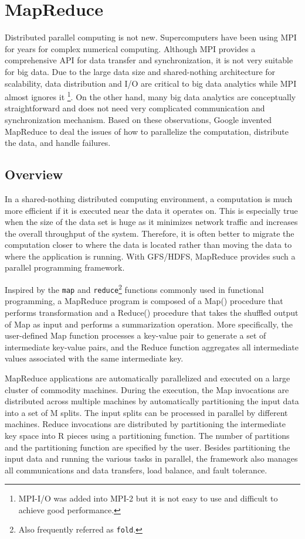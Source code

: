 \documentclass[12pt]{book}
\begin{document}
\section[MapReduce]
{MapReduce}
Distributed parallel computing is not new. Supercomputers have been using MPI \cite{Forum:1994:MMI} for years for complex numerical computing. Although MPI provides a comprehensive API for data transfer and synchronization, it is not very suitable for big data. Due to the large data size and shared-nothing architecture for scalability, data distribution and I/O are critical to big data analytics while MPI almost ignores it \footnote{MPI-I/O \cite{Gropp:1999:UMA} was added into MPI-2 but it is not easy to use and difficult to achieve good performance.}. On the other hand, many big data analytics are conceptually straightforward and does not need very complicated communication and synchronization mechanism. Based on these observations, Google invented MapReduce \cite{Dean:2008:MSD} to deal the issues of how to parallelize the computation, distribute the data, and handle failures.

\subsection{Overview}
In a shared-nothing distributed computing environment, a computation is much more efficient if it is executed near the data it operates on. This is especially true when the size of the data set is huge as it minimizes network traffic and increases the overall throughput of the system. Therefore, it is often better to migrate the computation closer to where the data is located rather than moving the data to where the application is running. With GFS/HDFS, MapReduce provides such a parallel programming framework.

Inspired by the \texttt{map} and \texttt{reduce}\footnote{Also frequently referred as \texttt{fold}.} functions commonly used in functional programming, a MapReduce program is composed of a Map() procedure that performs transformation and a Reduce() procedure that takes the shuffled output of Map as input and performs a summarization operation. More specifically, the user-defined Map function processes a key-value pair to generate a set of intermediate key-value pairs, and the Reduce function aggregates all intermediate values associated with the same intermediate key.

MapReduce applications are automatically parallelized and executed on a large cluster of commodity machines. During the execution, the Map invocations are distributed across multiple machines by automatically partitioning the input data into a set of M splits. The input splits can be processed in parallel by different machines. Reduce invocations are distributed by partitioning the intermediate key space into R pieces using a partitioning function. The number of partitions and the partitioning function are specified by the user. Besides partitioning the input data and running the various tasks in parallel, the framework also manages all communications and data transfers, load balance, and fault tolerance.
\end{document}
